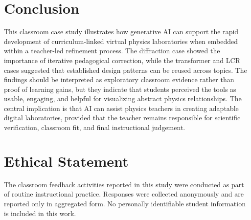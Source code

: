 \documentclass{iopjournal}
\begin{document}
\section{Conclusion}

This classroom case study illustrates how generative AI can support the rapid development of curriculum-linked virtual physics laboratories when embedded within a teacher-led refinement process. The diffraction case showed the importance of iterative pedagogical correction, while the transformer and LCR cases suggested that established design patterns can be reused across topics. The findings should be interpreted as exploratory classroom evidence rather than proof of learning gains, but they indicate that students perceived the tools as usable, engaging, and helpful for visualizing abstract physics relationships. The central implication is that AI can assist physics teachers in creating adaptable digital laboratories, provided that the teacher remains responsible for scientific verification, classroom fit, and final instructional judgement.



\section*{Ethical Statement}
The classroom feedback activities reported in this study were conducted as part of routine instructional practice. Responses were collected anonymously and are reported only in aggregated form. No personally identifiable student information is included in this work.







% 

\end{document}
